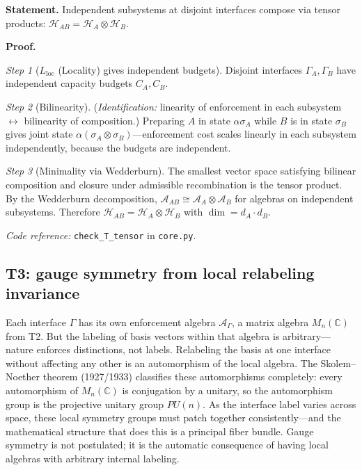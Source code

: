\documentclass[11pt]{article}
\newcommand{\coderef}[2]{\smallskip\noindent\textit{Code reference:} \texttt{#1} in \texttt{#2}.}
\begin{document}
\begin{tcolorbox}[apfbox, title={$T_{\mathrm{tensor}}$: Tensor Products from Compositional Independence}]
\textbf{Statement.}  Independent subsystems at disjoint interfaces compose via tensor products: $\mathcal{H}_{AB} = \mathcal{H}_A \otimes \mathcal{H}_B$.

\smallskip\noindent\textbf{Proof.}

\textit{Step 1} ($L_{\mathrm{loc}}$ (Locality) gives independent budgets).  Disjoint interfaces $\Gamma_A, \Gamma_B$ have independent capacity budgets $C_A, C_B$.

\textit{Step 2} (Bilinearity).  (\textit{Identification:} linearity of enforcement in each subsystem $\leftrightarrow$ bilinearity of composition.)  Preparing $A$ in state $\alpha\sigma_A$ while $B$ is in state $\sigma_B$ gives joint state $\alpha(\sigma_A \otimes \sigma_B)$---enforcement cost scales linearly in each subsystem independently, because the budgets are independent.

\textit{Step 3} (Minimality via Wedderburn).  The smallest vector space satisfying bilinear composition and closure under admissible recombination is the tensor product.  By the Wedderburn decomposition, $\mathcal{A}_{AB} \cong \mathcal{A}_A \otimes \mathcal{A}_B$ for algebras on independent subsystems.  Therefore $\mathcal{H}_{AB} = \mathcal{H}_A \otimes \mathcal{H}_B$ with $\dim = d_A \cdot d_B$.

\coderef{check\_T\_tensor}{core.py}
\end{tcolorbox}


\subsection{T3: gauge symmetry from local relabeling invariance}

Each interface $\Gamma$ has its own enforcement algebra $\mathcal{A}_\Gamma$, a matrix algebra $M_n(\mathbb{C})$ from T2.  But the labeling of basis vectors within that algebra is arbitrary---nature enforces distinctions, not labels.  Relabeling the basis at one interface without affecting any other is an automorphism of the local algebra.  The Skolem--Noether theorem (1927/1933) classifies these automorphisms completely: every automorphism of $M_n(\mathbb{C})$ is conjugation by a unitary, so the automorphism group is the projective unitary group $PU(n)$.  As the interface label varies across space, these local symmetry groups must patch together consistently---and the mathematical structure that does this is a principal fiber bundle.  Gauge symmetry is not postulated; it is the automatic consequence of having local algebras with arbitrary internal labeling.
\end{document}
